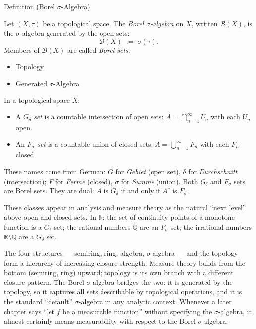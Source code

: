 \begin{definitionbox}{Definition (Borel $\sigma$-Algebra)}
\begin{definition}\label{def:borel}
Let $(X, \tau)$ be a topological space. The \emph{Borel $\sigma$-algebra}
on $X$, written $\mathcal{B}(X)$, is the $\sigma$-algebra generated by the
open sets:
\[
\mathcal{B}(X) \;:=\; \sigma(\tau).
\]
Members of $\mathcal{B}(X)$ are called \emph{Borel sets}.
\end{definition}
\end{definitionbox}

\begin{dependencies}
\begin{itemize}
  \item \hyperref[def:topology-defn]{Topology}
  \item \hyperref[def:generated-sigma]{Generated $\sigma$-Algebra}
\end{itemize}
\end{dependencies}

\begin{example*}
\label{ex:Fsigma-Gdelta}
In a topological space $X$:
\begin{itemize}
\item A \emph{$G_\delta$ set} is a countable intersection of open sets:
  $A = \bigcap_{n=1}^\infty U_n$ with each $U_n$ open.
\item An \emph{$F_\sigma$ set} is a countable union of closed sets:
  $A = \bigcup_{n=1}^\infty F_n$ with each $F_n$ closed.
\end{itemize}
These names come from German: $G$ for \emph{Gebiet} (open set), $\delta$ for
\emph{Durchschnitt} (intersection); $F$ for \emph{Ferme} (closed), $\sigma$
for \emph{Summe} (union). Both $G_\delta$ and $F_\sigma$ sets are Borel sets.
They are dual: $A$ is $G_\delta$ if and only if $A^c$ is $F_\sigma$.

These classes appear in analysis and measure theory as the natural ``next
level'' above open and closed sets. In $\mathbb{R}$: the set of continuity
points of a monotone function is a $G_\delta$ set; the rational numbers
$\mathbb{Q}$ are an $F_\sigma$ set; the irrational numbers $\mathbb{R}
\setminus \mathbb{Q}$ are a $G_\delta$ set.
\end{example*}

\begin{remark*}[Transition]
The four structures --- semiring, ring, algebra, $\sigma$-algebra --- and the
topology form a hierarchy of increasing closure strength. Measure theory
builds from the bottom (semiring, ring) upward; topology is its own branch
with a different closure pattern. The Borel $\sigma$-algebra bridges the two:
it is generated by the topology, so it captures all sets describable by
topological operations, and it is the standard ``default'' $\sigma$-algebra
in any analytic context. Whenever a later chapter says ``let $f$ be a
measurable function'' without specifying the $\sigma$-algebra, it almost
certainly means measurability with respect to the Borel $\sigma$-algebra.
\end{remark*}
